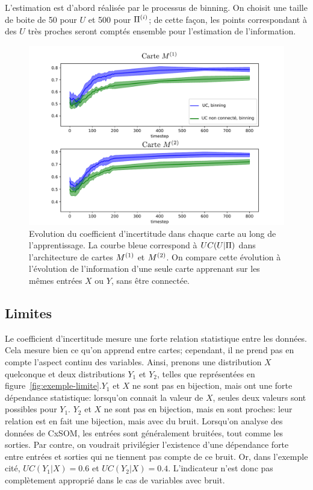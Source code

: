 L'estimation est d'abord réalisée par le processus de binning. On choisit une taille de boite de 50 pour $U$ et 500 pour $\Pi^{({i})}$; de cette façon, les points correspondant à des $U$ très proches seront comptés ensemble pour l'estimation de l'information.

\begin{figure}
\includegraphics[width=\textwidth]{evolution_MI_binning}
\caption{Evolution du coefficient d'incertitude dans chaque carte au long de l'apprentissage. La courbe bleue correspond à $UC(U|\Pi)$ dans l'architecture de cartes $M^{({1})}$ et $M^{({2})}$. On compare cette évolution à l'évolution de l'information d'une seule carte apprenant sur les mêmes entrées $X$ ou $Y$, sans être connectée.}
\label{fig:MI_evol}
\end{figure}



\subsection{Limites}

Le coefficient d'incertitude mesure une forte relation statistique entre les données. Cela mesure bien ce qu'on apprend entre cartes; cependant, il ne prend pas en compte l'aspect continu des variables. Ainsi, prenons une distribution $X$ quelconque et deux distributions $Y_1$ et $Y_2$, telles que représentées en figure~\ref{fig:exemple-limite}.$Y_1$ et $X$ ne sont pas en bijection, mais ont une forte dépendance statistique: lorsqu'on connait la valeur de $X$, seules deux valeurs sont possibles pour $Y_1$.
$Y_2$ et $X$ ne sont pas en bijection, mais en sont proches: leur relation est en fait une bijection, mais avec du bruit. Lorsqu'on analyse des données de CxSOM, les entrées sont généralement bruitées, tout comme les sorties. Par contre, on voudrait privilégier l'existence d'une dépendance forte entre entrées et sorties qui ne tiennent pas compte de ce bruit. Or, dans l'exemple cité, $UC(Y_1|X) = 0.6$ et $UC(Y_2|X) = 0.4$. L'indicateur n'est donc pas complètement approprié dans le cas de variables avec bruit.

